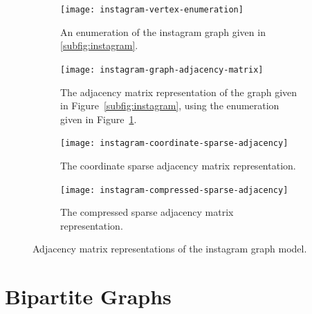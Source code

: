\begin{figure}[tbh]
  \begin{subfigure}[t]{0.175\textwidth}
    \centering
    \texttt{[image: instagram-vertex-enumeration]}
    \caption{\label{fig:instagram-vertex-enumeration}
    An enumeration of the instagram graph given in \protect\ref{subfig:instagram}.}
  \end{subfigure}
  \hspace{1em}
  \begin{subfigure}[t]{0.25\textwidth}
    \centering
    \texttt{[image: instagram-graph-adjacency-matrix]}
    \caption{\label{fig:instagram-graph-adjacency-matrix}
    The adjacency matrix representation of the graph given in Figure~\protect\ref{subfig:instagram},
    using the enumeration given in Figure~\protect\ref{fig:instagram-vertex-enumeration}.}
  \end{subfigure}
  \hspace{1em}
  \begin{subfigure}[t]{0.175\textwidth}
    \small
    \centering
    \texttt{[image: instagram-coordinate-sparse-adjacency]}
    \caption{\label{fig:instagram-coordinate-sparse-adjacency}
    The coordinate sparse adjacency matrix representation.}
  \end{subfigure}
  \hspace{1em}
  \begin{subfigure}[t]{0.3\textwidth}
    \small
    \centering
    \texttt{[image: instagram-compressed-sparse-adjacency]}
    \caption{\label{fig:instagram-compressed-sparse-adjacency}
    The compressed sparse adjacency matrix representation.}
  \end{subfigure}
  \caption{Adjacency matrix representations of the instagram graph model.\label{fig:instagram}}
\end{figure}


\section{Bipartite Graphs}
\label{sec:bipartite}

